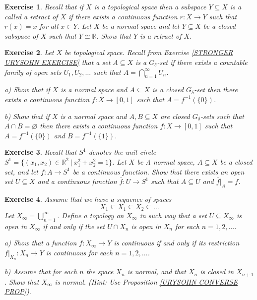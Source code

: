 \documentclass[11pt, letterpaper, oneside]{report}
\theoremstyle{pplain}
\newtheorem{ITERMVALUE THM}[theorem]{Intermediate Value Theorem}
\newtheorem{HEINEBOREL THM}[theorem]{Heine-Borel Theorem}
\newtheorem{UMETR THM}[theorem]{Urysohn Metrization Theorem}
\newtheorem{UMETR2 THM}[theorem]{Urysohn Metrization Theorem (v.2)}
\theoremstyle{ddefinition}
\theoremstyle{nnn}
\newtheorem{TDA NN}[theorem]{Topological Data Analysis. }
\theoremstyle{eexercise}
\newtheorem{exercise}{Exercise}[chapter]
\newcommand{\R}{{\mathbb R}}
\begin{document}
\begin{exercise}
Recall that if $X$ is a topological space  then a subspace $Y\subseteq X$ is a called a retract 
of $X$ if there exists a continuous function $r\colon X \to Y$ such that $r(x) = x$ for all $x\in Y$. 
Let $X$ be a normal space and let $Y\subseteq X$ be a closed subspace of $X$ such that 
$Y\cong \R$. Show that $Y$ is a retract of $X$. 
\end{exercise}




\begin{exercise}
\label{GDELTA URYSOHN FUNCTION EXERCISE}
Let $X$ be topological space. Recall from Exercise \ref{STRONGER URYSOHN EXERCISE} that 
a set $A\subseteq X$ is a $G_{\delta}$-set if there exists a countable family of open sets 
$U_{1}, U_{2}, \dots$ such that $A = \bigcap_{n=1}^{\infty} U_{n}$. 

a) Show that if $X$ is a normal space and $A\subseteq X$ is a closed $G_{\delta}$-set then 
there exists a continuous function $f\colon X\to [0, 1]$ such that $A = f^{-1}(\{0\})$.

b) Show that if $X$ is a normal space and $A, B \subseteq X$  are closed $G_{\delta}$-sets 
such that $A\cap B = \varnothing$ then there exists a continuous function $f\colon X\to [0, 1]$ 
such that $A = f^{-1}(\{0\})$ and $B = f^{-1}(\{1\})$.
\end{exercise}





\begin{exercise}
Recall that $S^{1}$ denotes the unit circle $S^{1} = \{(x_{1}, x_{2}) \in \R^{2} \ | \ x_{1}^{2} + x_{2}^{2} = 1\}$.
Let $X$ be A normal space, $A\subseteq X$ be a closed set, and let $f\colon A \to S^{1}$ be 
a continuous function. Show that there exists an open set $U\subseteq X$  and a continuous 
function $\bar{f}\colon U \to S^{1}$ such that  $A\subseteq U$ and $\bar{f}|_{A} = f$.
 
\end{exercise}






\begin{exercise}
Assume that we have a sequence of spaces
$$X_{1} \subseteq X_{1} \subseteq X_{2} \subseteq \dots$$
Let $X_{\infty} = \bigcup_{n=1}^{\infty}$. Define a topology on $X_{\infty}$ in such way that 
a set $U\subseteq X_{\infty}$ is open in $X_{\infty}$ if and only if the set $U\cap X_{n}$ is open in $X_{n}$
for each $n=1, 2, \dots$.

a) Show that a function $f\colon X_{\infty}\to Y$ is continuous if and only if its restriction 
$f|_{X_{n}}\colon X_{n}\to Y$ is continuous for each $n=1, 2, \dots$. 

b) Assume that for each $n$ the space $X_{n}$ is normal, and that $X_{n}$ is closed in $X_{n+1}$. 
Show that $X_{\infty}$ is normal. (Hint: Use Proposition \ref{URYSOHN CONVERSE PROP}).
\end{exercise}
\end{document}

